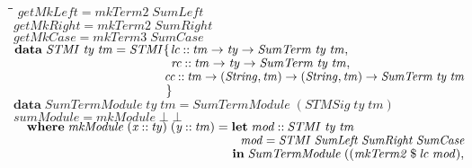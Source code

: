 \documentclass[10pt]{article}
\newlength{\lwidth}\setlength{\lwidth}{4.5cm}
\newlength{\cwidth}\setlength{\cwidth}{8mm} %
\newcommand{\Conid}[1]{\mathit{#1}}
\newcommand{\Varid}[1]{\mathit{#1}}
\begin{document}
\begin{tabbing}
\qquad\=\hspace{\lwidth}\=\hspace{\cwidth}\=\+\kill
${\Varid{getMkLeft}\mathrel{=}\Varid{mkTerm2}\;\Conid{SumLeft}}$\\
${\Varid{getMkRight}\mathrel{=}\Varid{mkTerm2}\;\Conid{SumRight}}$\\
${\Varid{getMkCase}\mathrel{=}\Varid{mkTerm3}\;\Conid{SumCase}}$\\
${}$\\
${}$\\
${}$\\
${\mathbf{data}\;\Conid{STMI}\;\Varid{ty}\;\Varid{tm}\mathrel{=}\Conid{STMI}\{\mskip1.5mu \Varid{lc}\mathbin{::}\Varid{tm}\to \Varid{ty}\to \Conid{SumTerm}\;\Varid{ty}\;\Varid{tm},}$\\
${\phantom{\mathbf{data}\;\Conid{STMI}\;\Varid{ty}\;\Varid{tm}\mathrel{=}\Conid{STMI}\{\mskip1.5mu \mbox{}}\Varid{rc}\mathbin{::}\Varid{tm}\to \Varid{ty}\to \Conid{SumTerm}\;\Varid{ty}\;\Varid{tm},}$\\
${\phantom{\mathbf{data}\;\Conid{STMI}\;\Varid{ty}\;\Varid{tm}\mathrel{=}\Conid{STMI}\{\mskip1.5mu \mbox{}}\Varid{cc}\mathbin{::}\Varid{tm}\to (\Conid{String},\Varid{tm})\to (\Conid{String},\Varid{tm})\to \Conid{SumTerm}\;\Varid{ty}\;\Varid{tm}}$\\
${\hskip12.00em\relax\mskip1.5mu\}}$\\
${}$\\
${\mathbf{data}\;\Conid{SumTermModule}\;\Varid{ty}\;\Varid{tm}\mathrel{=}\Conid{SumTermModule}\;(\Conid{STMSig}\;\Varid{ty}\;\Varid{tm})}$\\
${}$\\
${\Varid{sumModule}\mathrel{=}\Varid{mkModule}\;\bot \;\bot }$\\
${\hskip1.00em\relax\mathbf{where}\;\Varid{mkModule}\;(\Varid{x}\mathbin{::}\Varid{ty})\;(\Varid{y}\mathbin{::}\Varid{tm})\mathrel{=}\mathbf{let}\;\Varid{mod}\mathbin{::}\Conid{STMI}\;\Varid{ty}\;\Varid{tm}}$\\
${\hskip1.00em\relax\phantom{\mathbf{where}\;\Varid{mkModule}\;(\Varid{x}\mathbin{::}\Varid{ty})\;(\Varid{y}\mathbin{::}\Varid{tm})\mathrel{=}\mathbf{let}\;\mbox{}}\Varid{mod}\mathrel{=}\Conid{STMI}\;\Conid{SumLeft}\;\Conid{SumRight}\;\Conid{SumCase}}$\\
${\hskip1.00em\relax\phantom{\mathbf{where}\;\Varid{mkModule}\;(\Varid{x}\mathbin{::}\Varid{ty})\;(\Varid{y}\mathbin{::}\Varid{tm})\mathrel{=}\mbox{}}\mathbf{in}\;\Conid{SumTermModule}\;((\Varid{mkTerm2}\mathbin{\$}\Varid{lc}\;\Varid{mod}),}$\\

\end{tabbing}
\end{document}
